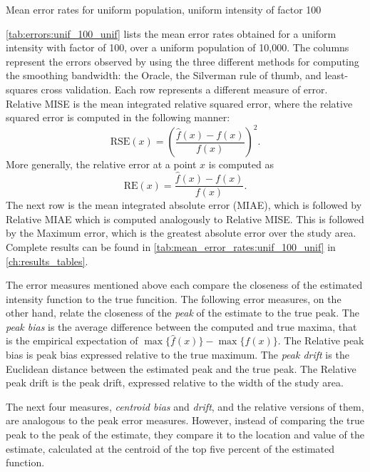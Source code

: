 \begin{table}[htbp]
\centering

\caption{Mean error rates for uniform population, uniform intensity of \gls{factor} 100}
\label{tab:errors:unif_100_unif}
\end{table}

\autoref{tab:errors:unif_100_unif} lists the mean error rates obtained for a uniform intensity with \gls{factor} of 100,
over a uniform population of 10,000.
The columns represent the errors observed by using the three different methods for computing the smoothing bandwidth:
the Oracle, the Silverman rule of thumb, and least-squares cross validation.
Each row represents a different measure of error.
Relative MISE is the mean integrated relative squared error,
where the relative squared error is computed in the following manner:
\[ \mbox{RSE}(x) = \left(\frac{\hat{f}(x)-f(x)}{f(x)}\right)^2 .\]
More generally, the relative error at a point \(x\) is computed as
\[ \mbox{RE}(x) =  \frac{\hat{f}(x)-f(x)}{f(x)} .\]
The next row is the mean integrated absolute error (MIAE),
which is followed by Relative MIAE which is computed analogously to Relative MISE.
This is followed by the Maximum error, which is the greatest absolute error over the study area.
Complete results can be found in \autoref{tab:mean_error_rates:unif_100_unif} in \autoref{ch:results_tables}.

The error measures mentioned above each compare the closeness of the estimated intensity function to the true funcition.
The following error measures, on the other hand, relate the closeness of the \textit{peak} of the estimate to the true peak.
The \textit{peak bias} is the average difference between the computed and true maxima,
that is the empirical expectation of \(\max{\{\hat{f}(x)\}} - \max{\{f(x)\}}\).
The Relative peak bias is peak bias expressed relative to the true maximum.
The \textit{peak drift} is the Euclidean distance between the estimated peak and the true peak.
The Relative peak drift is the peak drift, expressed relative to the width of the study area.

The next four measures, \textit{centroid bias} and \textit{drift}, and the relative versions of them, are analogous to the peak error measures.
However, instead of comparing the true peak to the peak of the estimate, they compare it to the location and value of the estimate, calculated at the centroid of the top five percent of the estimated function.

